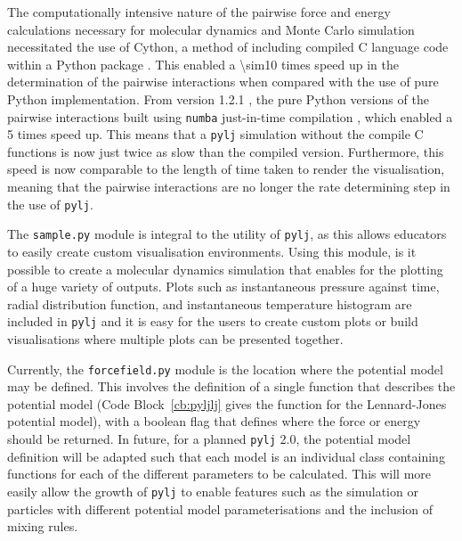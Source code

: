 The computationally intensive nature of the pairwise force and energy calculations necessary for molecular dynamics and Monte Carlo simulation necessitated the use of Cython, a method of including compiled C language code within a Python package \cite{noauthor_cython_nodate}.
This enabled a \num{\sim10} times speed up in the determination of the pairwise interactions when compared with the use of pure Python implementation.
From version 1.2.1 \cite{mccluskey_arm61/pylj_2019-1}, the pure Python versions of the pairwise interactions built using \texttt{numba} just-in-time compilation \cite{noauthor_numba_nodate}, which enabled a \num{5} times speed up.
This means that a \texttt{pylj} simulation without the compile C functions is now just twice as slow than the compiled version.
Furthermore, this speed is now comparable to the length of time taken to render the visualisation, meaning that the pairwise interactions are no longer the rate determining step in the use of \texttt{pylj}.

The \texttt{sample.py} module is integral to the utility of \texttt{pylj}, as this allows educators to easily create custom visualisation environments.
Using this module, is it possible to create a molecular dynamics simulation that enables for the plotting of a huge variety of outputs.
Plots such as instantaneous pressure against time, radial distribution function, and instantaneous temperature histogram are included in \texttt{pylj} and it is easy for the users to create custom plots or build visualisations where multiple plots can be presented together.

Currently, the \texttt{forcefield.py} module is the location where the potential model may be defined.
This involves the definition of a single function that describes the potential model (Code Block~\ref{cb:pyljlj} gives the function for the Lennard-Jones potential model), with a boolean flag that defines where the force or energy should be returned.
In future, for a planned \texttt{pylj} \num{2.0}, the potential model definition will be adapted such that each model is an individual class containing functions for each of the different parameters to be calculated.
This will more easily allow the growth of \texttt{pylj} to enable features such as the simulation or particles with different potential model parameterisations and the inclusion of mixing rules.
%
\begin{figure}
    \centering
        
\end{figure}
%

